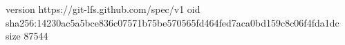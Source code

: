 version https://git-lfs.github.com/spec/v1
oid sha256:14230ac5a5bce836c07571b75be570565fd464fed7aca0bd159c8c06f4fda1dc
size 87544
